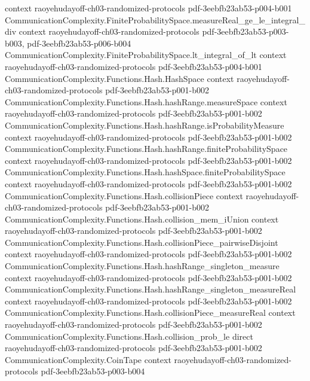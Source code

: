 \begin{theorem}
  {context}
  {raoyehudayoff-ch03-randomized-protocols}
  {pdf-3eebfb23ab53-p004-b001}
\proofstep
  {CommunicationComplexity.FiniteProbabilitySpace.measureReal_ge_le_integral_div}
  {context}
  {raoyehudayoff-ch03-randomized-protocols}
  {pdf-3eebfb23ab53-p003-b003,
    pdf-3eebfb23ab53-p006-b004}
\proofstep
  {CommunicationComplexity.FiniteProbabilitySpace.lt_integral_of_lt}
  {context}
  {raoyehudayoff-ch03-randomized-protocols}
  {pdf-3eebfb23ab53-p004-b001}
\proofstep
  {CommunicationComplexity.Functions.Hash.HashSpace}
  {context}
  {raoyehudayoff-ch03-randomized-protocols}
  {pdf-3eebfb23ab53-p001-b002}
\proofstep
  {CommunicationComplexity.Functions.Hash.hashRange.measureSpace}
  {context}
  {raoyehudayoff-ch03-randomized-protocols}
  {pdf-3eebfb23ab53-p001-b002}
\proofstep
  {CommunicationComplexity.Functions.Hash.hashRange.isProbabilityMeasure}
  {context}
  {raoyehudayoff-ch03-randomized-protocols}
  {pdf-3eebfb23ab53-p001-b002}
\proofstep
  {CommunicationComplexity.Functions.Hash.hashRange.finiteProbabilitySpace}
  {context}
  {raoyehudayoff-ch03-randomized-protocols}
  {pdf-3eebfb23ab53-p001-b002}
\proofstep
  {CommunicationComplexity.Functions.Hash.hashSpace.finiteProbabilitySpace}
  {context}
  {raoyehudayoff-ch03-randomized-protocols}
  {pdf-3eebfb23ab53-p001-b002}
\proofstep
  {CommunicationComplexity.Functions.Hash.collisionPiece}
  {context}
  {raoyehudayoff-ch03-randomized-protocols}
  {pdf-3eebfb23ab53-p001-b002}
\proofstep
  {CommunicationComplexity.Functions.Hash.collision_mem_iUnion}
  {context}
  {raoyehudayoff-ch03-randomized-protocols}
  {pdf-3eebfb23ab53-p001-b002}
\proofstep
  {CommunicationComplexity.Functions.Hash.collisionPiece_pairwiseDisjoint}
  {context}
  {raoyehudayoff-ch03-randomized-protocols}
  {pdf-3eebfb23ab53-p001-b002}
\proofstep
  {CommunicationComplexity.Functions.Hash.hashRange_singleton_measure}
  {context}
  {raoyehudayoff-ch03-randomized-protocols}
  {pdf-3eebfb23ab53-p001-b002}
\proofstep
  {CommunicationComplexity.Functions.Hash.hashRange_singleton_measureReal}
  {context}
  {raoyehudayoff-ch03-randomized-protocols}
  {pdf-3eebfb23ab53-p001-b002}
\proofstep
  {CommunicationComplexity.Functions.Hash.collisionPiece_measureReal}
  {context}
  {raoyehudayoff-ch03-randomized-protocols}
  {pdf-3eebfb23ab53-p001-b002}
\proofstep
  {CommunicationComplexity.Functions.Hash.collision_prob_le}
  {direct}
  {raoyehudayoff-ch03-randomized-protocols}
  {pdf-3eebfb23ab53-p001-b002}
\proofstep
  {CommunicationComplexity.CoinTape}
  {context}
  {raoyehudayoff-ch03-randomized-protocols}
  {pdf-3eebfb23ab53-p003-b004}
\proofstep

\end{theorem}
